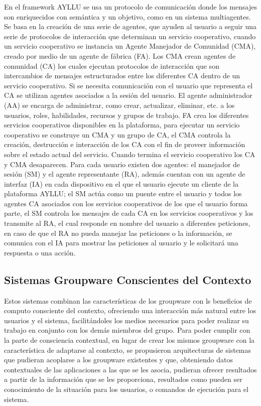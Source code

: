En el framework AYLLU \cite{arias2012platform} se usa un protocolo de comunicaci\'on donde los mensajes son enriquecidos con sem\'antica y un objetivo, como en un sistema multiagentes. Se basa en la creaci\'on de una serie de agentes, que ayuden al usuario a seguir una serie de protocolos de interacci\'on que determinan un servicio cooperativo, cuando un servicio cooperativo se instancia un Agente Manejador de Comunidad (CMA), creado por medio de un agente de f\'abrica (FA). Los CMA crean agentes de comunidad (CA) los cuales ejecutan protocolos de interacci\'on que son intercambios de mensajes estructurados entre los diferentes CA dentro de un servicio cooperativo. Si se necesita comunicaci\'on con el usuario que representa el CA  se utilizan agentes asociados a la sesi\'on del usuario. El agente administrador (AA) se encarga de administrar, como crear, actualizar, eliminar, etc. a los usuarios, roles, habilidades, recursos y grupos de trabajo. FA crea los diferentes servicios cooperativos disponibles en la plataforma, para ejecutar un servicio cooperativo se construye un CMA y un grupo de CA, el CMA controla la creaci\'on, destrucci\'on e interacci\'on  de los CA con el fin de proveer informaci\'on sobre el estado actual del servicio. Cuando termina el servicio cooperativo los CA y CMA desaparecen. Para cada usuario existen dos agentes: el manejador de sesi\'on (SM) y el agente representante (RA), adem\'as cuentan con un agente de interfaz (IA) en cada dispositivo en el que el usuario ejecute un cliente de la plataforma AYLLU; el SM act\'ua como un puente entre el usuario y todos los agentes CA asociados con los servicios cooperativos de los que el usuario forma parte, el SM controla los mensajes de cada CA en los servicios cooperativos y los transmite al RA, el cual responde en nombre del usuario a diferentes peticiones, en caso de que el RA no pueda manejar las peticiones o la informaci\'on, se comunica con el IA para mostrar las peticiones al usuario y le solicitar\'a una respuesta o una acci\'on.

\subsection{Sistemas Groupware Conscientes del Contexto}

Estos sistemas combinan las caracter\'isticas de los groupware con ls beneficios de computo consciente del contexto, ofreciendo una interacci\'on más natural entre los usuarios y el sistema, facilit\'andoles los medios necesarios para poder realizar su trabajo en conjunto con los dem\'as miembros del grupo. Para poder cumplir con la parte de consciencia contextual, en lugar de crear los mismos groupware con la caracter\'istica de adaptarse al contexto, se propusieron arquitecturas de sistemas que pudieran acoplarse a los groupware existentes y que, obteniendo datos contextuales de las aplicaciones a las que se les asocia, pudieran ofrecer resultados a partir de la informaci\'on que se les proporciona, resultados como pueden ser conocimiento de la situaci\'on para los usuarios, o comandos de ejecuci\'on para el sistema.

